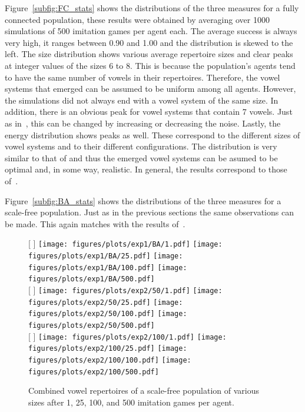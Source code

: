 \documentclass[11pt]{article}
\begin{document}
Figure~\ref{subfig:FC_stats} shows the distributions of the three measures for a fully connected population, these results were obtained by averaging over 1000 simulations of 500 imitation games per
agent each. The average success is always very high, it ranges between 0.90 and 1.00 and the distribution is skewed to the left. The size distribution shows various average repertoire sizes and clear
peaks at integer values of the sizes 6 to 8. This is because the population's agents tend to have the same number of vowels in their repertoires. Therefore, the vowel systems that emerged can be
assumed to be uniform among all agents. However, the simulations did not always end with a vowel system of the same size. In addition, there is an obvious peak for vowel systems that
contain 7 vowels. Just as in~, this can be changed by increasing or decreasing the noise.
Lastly, the energy distribution shows peaks as well. These correspond to the different sizes of vowel systems and to their different configurations. The distribution is very similar to that of
 and thus the emerged vowel systems can be asumed to be optimal and, in some way, realistic.
In general, the results correspond to those of~.

Figure~\ref{subfig:BA_stats} shows the distributions of the three measures for a scale-free population.
Just as in the previous sections the same observations can be made. This again matches with the results
of~.

\begin{figure}[t]
    \centering
    [%
        \textwidth %
    ]%
    {%
        \texttt{[image: figures/plots/exp1/BA/1.pdf]}
        \texttt{[image: figures/plots/exp1/BA/25.pdf]}
        \texttt{[image: figures/plots/exp1/BA/100.pdf]}
        \texttt{[image: figures/plots/exp1/BA/500.pdf]}
    }%
    \\\bigskip
    [%
        \textwidth %
    ]%
    {%
        \texttt{[image: figures/plots/exp2/50/1.pdf]}
        \texttt{[image: figures/plots/exp2/50/25.pdf]}
        \texttt{[image: figures/plots/exp2/50/100.pdf]}
        \texttt{[image: figures/plots/exp2/50/500.pdf]}
    }%
    \\\bigskip
    [%
        \textwidth %
    ]%
    {%
        \texttt{[image: figures/plots/exp2/100/1.pdf]}
        \texttt{[image: figures/plots/exp2/100/25.pdf]}
        \texttt{[image: figures/plots/exp2/100/100.pdf]}
        \texttt{[image: figures/plots/exp2/100/500.pdf]}
    }%
    \caption{Combined vowel repertoires of a scale-free population of various sizes after 1, 25, 100, and 500
        imitation games per agent.}
    \label{fig:res_2}
\end{figure}
\end{document}
